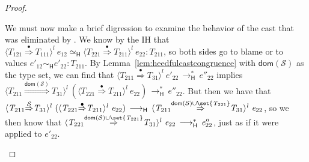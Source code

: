 \documentclass[9pt]{extarticle}
\newcommand{\ottnt}[1]{\mathit{#1}}
\begin{document}
{\begin{lemma}
\begin{proof}
{\begin{itemize}
\begin{itemize}
        We must now make a brief digression to examine the behavior of
        the cast that was eliminated by .
We know by the IH that $  \langle  \ottnt{T_{{\mathrm{121}}}}  \mathord{ \overset{\bullet}{\Rightarrow} }  \ottnt{T_{{\mathrm{111}}}}  \rangle^{ \ottnt{l} } ~  \ottnt{e_{{\mathrm{12}}}}    \simeq _{  \mathsf{H}  }   \langle  \ottnt{T_{{\mathrm{221}}}}  \mathord{ \overset{\bullet}{\Rightarrow} }  \ottnt{T_{{\mathrm{211}}}}  \rangle^{ \ottnt{l} } ~  \ottnt{e_{{\mathrm{22}}}}   :  \ottnt{T_{{\mathrm{211}}}} $, so both sides go to blame or to values $ \ottnt{e'_{{\mathrm{12}}}}   \sim _{  \mathsf{H}  }  \ottnt{e'_{{\mathrm{22}}}}  :  \ottnt{T_{{\mathrm{211}}}} $.  By Lemma~\ref{lem:heedfulcastcongruence}
        with $ \mathsf{dom} ( \mathcal{S} ) $ as the type set, we can find that
        $ \langle  \ottnt{T_{{\mathrm{211}}}}  \mathord{ \overset{\bullet}{\Rightarrow} }  \ottnt{T_{{\mathrm{31}}}}  \rangle^{ \ottnt{l} } ~  \ottnt{e'_{{\mathrm{22}}}}  \,  \longrightarrow ^{*}_{  \mathsf{H}  }  \, \ottnt{e''_{{\mathrm{22}}}}$ implies $ \langle  \ottnt{T_{{\mathrm{211}}}}  \mathord{ \overset{  \mathsf{dom} ( \mathcal{S} )  }{\Rightarrow} }  \ottnt{T_{{\mathrm{31}}}}  \rangle^{ \ottnt{l} } ~   (  \langle  \ottnt{T_{{\mathrm{221}}}}  \mathord{ \overset{\bullet}{\Rightarrow} }  \ottnt{T_{{\mathrm{211}}}}  \rangle^{ \ottnt{l} } ~  \ottnt{e_{{\mathrm{22}}}}  )   \,  \longrightarrow ^{*}_{  \mathsf{H}  }  \, \ottnt{e''_{{\mathrm{22}}}}$.
But then we have that $ \langle  \ottnt{T_{{\mathrm{211}}}}  \mathord{ \overset{ \mathcal{S} }{\Rightarrow} }  \ottnt{T_{{\mathrm{31}}}}  \rangle^{ \ottnt{l} } ~   (  \langle  \ottnt{T_{{\mathrm{221}}}}  \mathord{ \overset{\bullet}{\Rightarrow} }  \ottnt{T_{{\mathrm{211}}}}  \rangle^{ \ottnt{l} } ~  \ottnt{e_{{\mathrm{22}}}}  )   \,  \longrightarrow _{  \mathsf{H}  }  \,  \langle  \ottnt{T_{{\mathrm{211}}}}  \mathord{ \overset{   \mathsf{dom} ( \mathcal{S} )   \cup   \set{  \ottnt{T_{{\mathrm{221}}}}  }   }{\Rightarrow} }  \ottnt{T_{{\mathrm{31}}}}  \rangle^{ \ottnt{l} } ~  \ottnt{e_{{\mathrm{22}}}} $, so we then know
        that $ \langle  \ottnt{T_{{\mathrm{221}}}}  \mathord{ \overset{   \mathsf{dom} ( \mathcal{S} )   \cup   \set{  \ottnt{T_{{\mathrm{221}}}}  }   }{\Rightarrow} }  \ottnt{T_{{\mathrm{31}}}}  \rangle^{ \ottnt{l} } ~  \ottnt{e_{{\mathrm{22}}}}  \,  \longrightarrow ^{*}_{  \mathsf{H}  }  \, \ottnt{e''_{{\mathrm{22}}}}$, just
        as if it were applied to $\ottnt{e'_{{\mathrm{22}}}}$.


\end{itemize}
\end{itemize}}
\end{proof}
\end{lemma}}
\end{document}
